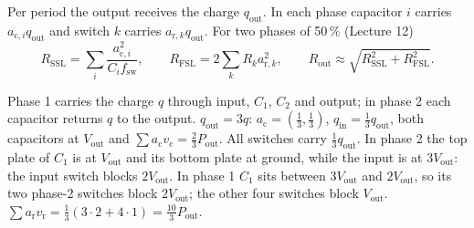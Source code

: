


Per period the output receives the charge $q_\mathrm{out}$. In each phase capacitor $i$ carries $a_{\mathrm{c},i}q_\mathrm{out}$ and switch $k$ carries $a_{\mathrm{r},k}q_\mathrm{out}$. For two phases of 50\,\% (Lecture 12)
\begin{equation}
	R_\mathrm{SSL}=\sum_i\frac{a_{\mathrm{c},i}^2}{C_if_\mathrm{sw}},\qquad R_\mathrm{FSL}=2\sum_kR_ka_{\mathrm{r},k}^2,\qquad R_\mathrm{out}\approx\sqrt{R_\mathrm{SSL}^2+R_\mathrm{FSL}^2}.
\end{equation}




\begin{solutionblock}
	Phase 1 carries the charge $q$ through input, $C_1$, $C_2$ and output; in phase 2 each capacitor returns $q$ to the output. $q_\mathrm{out}=3q$: $a_\mathrm{c}=(\tfrac13,\tfrac13)$, $q_\mathrm{in}=\tfrac13q_\mathrm{out}$, both capacitors at $V_\mathrm{out}$ and $\sum a_\mathrm{c}v_\mathrm{c}=\tfrac23P_\mathrm{out}$. All switches carry $\tfrac13q_\mathrm{out}$. In phase 2 the top plate of $C_1$ is at $V_\mathrm{out}$ and its bottom plate at ground, while the input is at $3V_\mathrm{out}$: the input switch blocks $2V_\mathrm{out}$. In phase 1 $C_1$ sits between $3V_\mathrm{out}$ and $2V_\mathrm{out}$, so its two phase-2 switches block $2V_\mathrm{out}$; the other four switches block $V_\mathrm{out}$. $\sum a_\mathrm{r}v_\mathrm{r}=\tfrac13(3\cdot2+4\cdot1)=\tfrac{10}{3}P_\mathrm{out}$.
\end{solutionblock}

